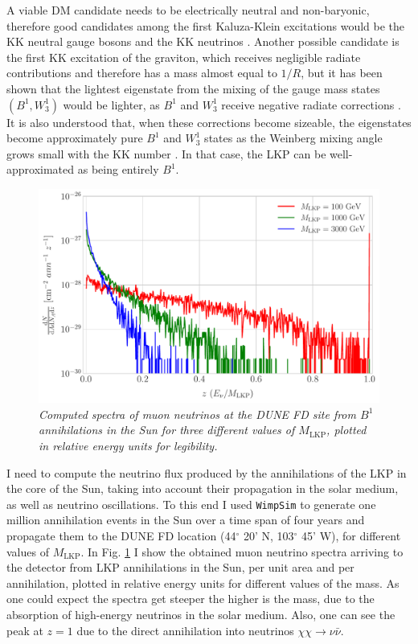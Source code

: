 A viable DM candidate needs to be electrically neutral and non-baryonic, therefore good candidates among the first Kaluza-Klein excitations would be the KK neutral gauge bosons and the KK neutrinos \cite{Servant2002}. Another possible candidate is the first KK excitation of the graviton, which receives negligible radiate contributions and therefore has a mass almost equal to $1/R$, but it has been shown that the lightest eigenstate from the mixing of the gauge mass states $\left(B^{1}, W_{3}^{1}\right)$ would be lighter, as $B^{1}$ and $W_{3}^{1}$ receive negative radiate corrections \cite{Cheng2002}. It is also understood that, when these corrections become sizeable, the eigenstates become approximately pure $B^{1}$ and $W_{3}^{1}$ states as the Weinberg mixing angle grows small with the KK number \cite{Cheng2002}. In that case, the LKP can be well-approximated as being entirely $B^{1}$.

\begin{figure}[t]
	\centering
	\includegraphics[width=0.9\linewidth]{Images/DM_Analysis/KK_nu_flux}
	\caption{\textit{Computed spectra of muon neutrinos at the DUNE FD site from $B^{1}$ annihilations in the Sun for three different values of $M_{\mathrm{LKP}}$, plotted in relative energy units for legibility.}}
	\label{fig:KK_nu_flux}
\end{figure}

I need to compute the neutrino flux produced by the annihilations of the LKP in the core of the Sun, taking into account their propagation in the solar medium, as well as neutrino oscillations.  To this end I used \texttt{WimpSim} \cite{Blennow2007, WimpSim} to generate one million annihilation events in the Sun over a time span of four years and propagate them to the DUNE FD location (44$^{\circ} $ 20' N, 103$^{\circ} $ 45' W), for different values of $M_{\mathrm{LKP}}$. In Fig. \ref{fig:KK_nu_flux} I show the obtained muon neutrino spectra arriving to the detector from LKP annihilations in the Sun, per unit area and per annihilation, plotted in relative energy units for different values of the mass. As one could expect the spectra get steeper the higher is the mass, due to the absorption of high-energy neutrinos in the solar medium. Also, one can see  the peak at $z=1$ due to the direct annihilation into neutrinos $\chi \chi \rightarrow \nu \bar{\nu}$.

